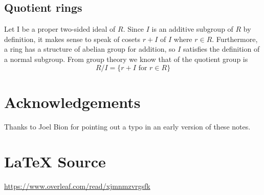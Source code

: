 \documentclass{article}
\theoremstyle{definition}
\begin{document}
\subsection{Quotient rings}
Let I be a proper two-sided ideal of $R$. Since $I$ is an
additive subgroup of $R$ by definition, it makes sense to speak
of cosets $r + I$ of $I$ where $r \in R$. Furthermore, a ring has
a structure of abelian group for addition, so $I$ satisfies the
definition of a normal subgroup.  From group theory we know that
of the quotient group is
\begin{equation*}
R/I = \{r + I \text{ for } r \in R\}
\end{equation*}
%
%
%
\bigskip
\section*{Acknowledgements}
Thanks to Joel Bion for pointing out a typo in an early version
of these notes. 
%
%
\section*{\LaTeX \hspace{0.10 mm} Source}
\url{https://www.overleaf.com/read/xjmnmzvrgsfk}
%
%
%


%
%
\end{document}
